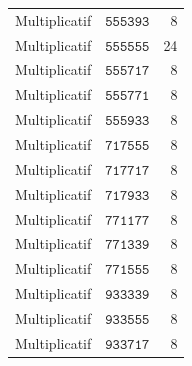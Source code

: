 \begin{table}[!htbp]
\begin{tabular}{@{}llr@{}}
Multiplicatif&\(\mathtt{555393}\)&8\\
Multiplicatif&\(\mathtt{555555}\)&24\\
Multiplicatif&\(\mathtt{555717}\)&8\\
Multiplicatif&\(\mathtt{555771}\)&8\\
Multiplicatif&\(\mathtt{555933}\)&8\\
Multiplicatif&\(\mathtt{717555}\)&8\\
Multiplicatif&\(\mathtt{717717}\)&8\\
Multiplicatif&\(\mathtt{717933}\)&8\\
Multiplicatif&\(\mathtt{771177}\)&8\\
Multiplicatif&\(\mathtt{771339}\)&8\\
Multiplicatif&\(\mathtt{771555}\)&8\\
Multiplicatif&\(\mathtt{933339}\)&8\\
Multiplicatif&\(\mathtt{933555}\)&8\\
Multiplicatif&\(\mathtt{933717}\)&8\\
\bottomrule
\end{tabular}\end{table}
